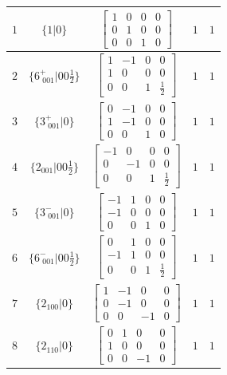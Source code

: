 \documentclass[fleqn,8pt]{jsarticle}
\begin{document}
\begin{longtable}{ccccc}
$ 1 $ & $ \{1|0\} $ & $ \begin{bmatrix} 1 & 0 & 0 & 0 \\ 0 & 1 & 0 & 0 \\ 0 & 0 & 1 & 0 \end{bmatrix} $ & $ 1 $ & $ 1 $ \\ \hline
$ 2 $ & $ \{6^{+}_{\,\,001}|0 0 \frac{1}{2}\} $ & $ \begin{bmatrix} 1 & -1 & 0 & 0 \\ 1 & 0 & 0 & 0 \\ 0 & 0 & 1 & \frac{1}{2} \end{bmatrix} $ & $ 1 $ & $ 1 $ \\ \hline
$ 3 $ & $ \{3^{+}_{\,\,001}|0\} $ & $ \begin{bmatrix} 0 & -1 & 0 & 0 \\ 1 & -1 & 0 & 0 \\ 0 & 0 & 1 & 0 \end{bmatrix} $ & $ 1 $ & $ 1 $ \\ \hline
$ 4 $ & $ \{2{}_{001}|0 0 \frac{1}{2}\} $ & $ \begin{bmatrix} -1 & 0 & 0 & 0 \\ 0 & -1 & 0 & 0 \\ 0 & 0 & 1 & \frac{1}{2} \end{bmatrix} $ & $ 1 $ & $ 1 $ \\ \hline
$ 5 $ & $ \{3^{-}_{\,\,001}|0\} $ & $ \begin{bmatrix} -1 & 1 & 0 & 0 \\ -1 & 0 & 0 & 0 \\ 0 & 0 & 1 & 0 \end{bmatrix} $ & $ 1 $ & $ 1 $ \\ \hline
$ 6 $ & $ \{6^{-}_{\,\,001}|0 0 \frac{1}{2}\} $ & $ \begin{bmatrix} 0 & 1 & 0 & 0 \\ -1 & 1 & 0 & 0 \\ 0 & 0 & 1 & \frac{1}{2} \end{bmatrix} $ & $ 1 $ & $ 1 $ \\ \hline
$ 7 $ & $ \{2{}_{100}|0\} $ & $ \begin{bmatrix} 1 & -1 & 0 & 0 \\ 0 & -1 & 0 & 0 \\ 0 & 0 & -1 & 0 \end{bmatrix} $ & $ 1 $ & $ 1 $ \\ \hline
$ 8 $ & $ \{2{}_{110}|0\} $ & $ \begin{bmatrix} 0 & 1 & 0 & 0 \\ 1 & 0 & 0 & 0 \\ 0 & 0 & -1 & 0 \end{bmatrix} $ & $ 1 $ & $ 1 $ \\ \hline

\end{longtable}
\end{document}

